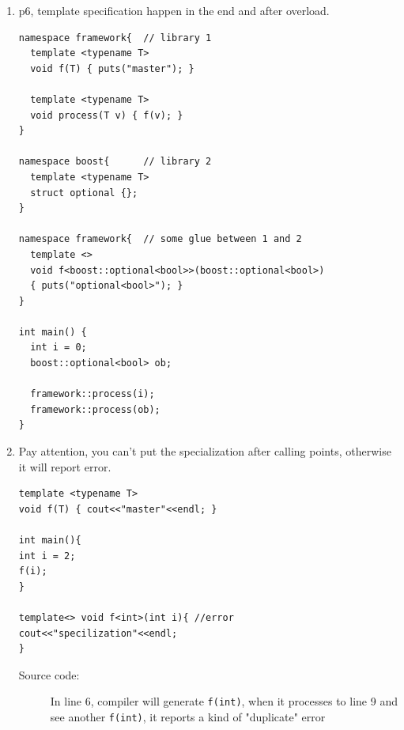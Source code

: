 \documentclass[a4paper,11pt,twoside]{book}
\begin{document}
\begin{itemize}
\begin{enumerate}
\begin{lstlisting}[]
namespace framework{  // library 1
  template <typename T>
  void f(T) { puts("master"); }
 
  template <typename T>
  void process(T v) { f(v); } 
}
 
namespace boost{      // library 2
  template <typename T>
  struct optional {};
}
 
namespace boost {      // some glue between 1 and 2
  template <typename T>
  void f(optional<T>) { puts("optional<T>"); }
    
  inline
  void f(optional<bool>) { puts("optional<bool>"); }
}
 
int main(){
  int i = 0;
  boost::optional<int>  oi;
  boost::optional<bool> ob;
  
  framework::process(i);
  framework::process(oi); //output "optional<T>"
  framework::process(ob); //output "optional<bool>"
}
\end{lstlisting}



\item p6, template specification happen in the end and after overload. 
\begin{lstlisting}[]
namespace framework{  // library 1
  template <typename T>
  void f(T) { puts("master"); }
 
  template <typename T>
  void process(T v) { f(v); } 
}
 
namespace boost{      // library 2
  template <typename T>
  struct optional {};
}
 
namespace framework{  // some glue between 1 and 2
  template <>
  void f<boost::optional<bool>>(boost::optional<bool>)
  { puts("optional<bool>"); }
}
 
int main() {
  int i = 0;
  boost::optional<bool> ob;
  
  framework::process(i);
  framework::process(ob);
}
\end{lstlisting}

			
		\item Pay attention, you can't put the specialization after calling points, otherwise it will report error. 
\begin{lstlisting}
template <typename T>
void f(T) { cout<<"master"<<endl; }

int main(){
int i = 2;
f(i);
}

template<> void f<int>(int i){ //error
cout<<"specilization"<<endl;
}
\end{lstlisting}
\begin{description}
	\item[Source code:] In line 6, compiler will generate \texttt{f(int)}, when it processes to line 9 and see another \texttt{f(int)}, it reports a kind of "duplicate" error
\end{description}


\end{enumerate}
\end{itemize}
\end{document}
